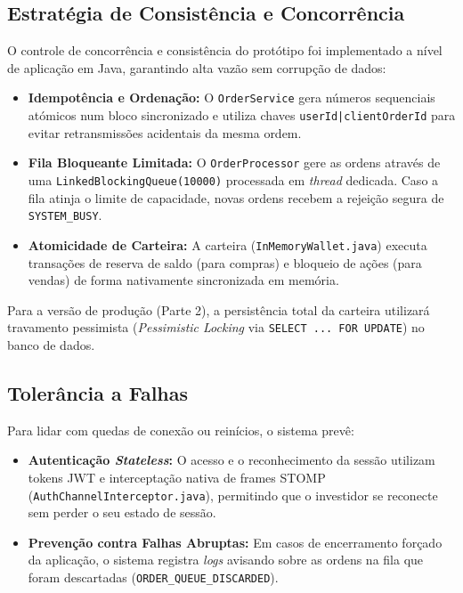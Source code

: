 \documentclass[12pt,a4paper]{article}
\begin{document}
\subsection{Estratégia de Consistência e Concorrência}
O controle de concorrência e consistência do protótipo foi implementado a nível de aplicação em Java, garantindo alta vazão sem corrupção de dados:
\begin{itemize}
    \item \textbf{Idempotência e Ordenação:} O \texttt{OrderService} gera números sequenciais atómicos num bloco sincronizado e utiliza chaves \texttt{userId|clientOrderId} para evitar retransmissões acidentais da mesma ordem.
    \item \textbf{Fila Bloqueante Limitada:} O \texttt{OrderProcessor} gere as ordens através de uma \texttt{LinkedBlockingQueue(10000)} processada em \textit{thread} dedicada. Caso a fila atinja o limite de capacidade, novas ordens recebem a rejeição segura de \texttt{SYSTEM\_BUSY}.
    \item \textbf{Atomicidade de Carteira:} A carteira (\texttt{InMemoryWallet.java}) executa transações de reserva de saldo (para compras) e bloqueio de ações (para vendas) de forma nativamente sincronizada em memória.
\end{itemize}
Para a versão de produção (Parte 2), a persistência total da carteira utilizará travamento pessimista (\textit{Pessimistic Locking} via \texttt{SELECT ... FOR UPDATE}) no banco de dados.

\subsection{Tolerância a Falhas}
Para lidar com quedas de conexão ou reinícios, o sistema prevê:
\begin{itemize}
    \item \textbf{Autenticação \textit{Stateless}:} O acesso e o reconhecimento da sessão utilizam tokens JWT e interceptação nativa de frames STOMP (\texttt{AuthChannelInterceptor.java}), permitindo que o investidor se reconecte sem perder o seu estado de sessão.
    \item \textbf{Prevenção contra Falhas Abruptas:} Em casos de encerramento forçado da aplicação, o sistema registra \textit{logs} avisando sobre as ordens na fila que foram descartadas (\texttt{ORDER\_QUEUE\_DISCARDED}).
\end{itemize}
\end{document}
